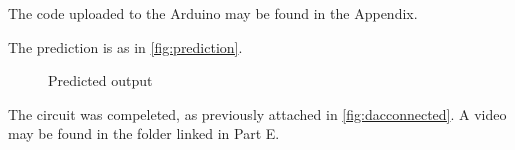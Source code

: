 
The code uploaded to the Arduino may be found in the Appendix.

\begin{arabicparts}
    \questionpart The prediction is as in \autoref{fig:prediction}.
    \begin{figure}[ht]
        \centering
        \scalebox{0.6}{}
        \caption{Predicted output}
        \label{fig:prediction}
    \end{figure}

    \questionpart The circuit was compeleted, as previously attached in \autoref{fig:dacconnected}. 
                    A video may be found in the folder linked in Part E.
\end{arabicparts}

